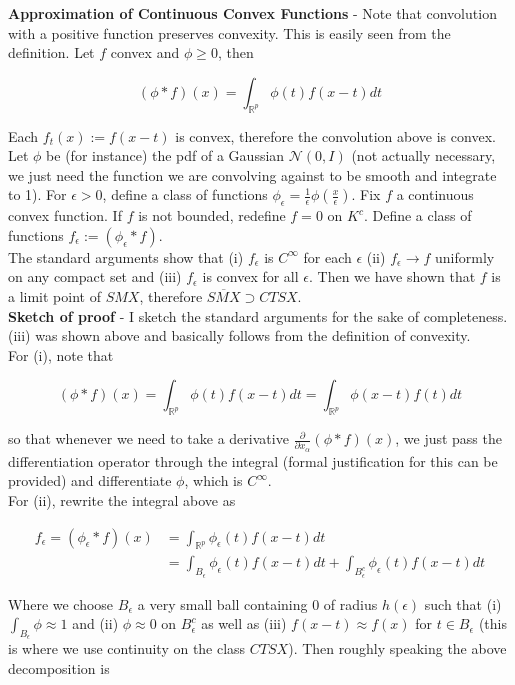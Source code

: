 \documentclass[11pt,reqno]{amsart}
\theoremstyle{definition}
\numberwithin{equation}{section}
\newcommand{\eps}{\epsilon}
\newcommand{\mc}{\mathcal}
\newcommand{\mr}{\mathbb{R}}
\newcommand{\tb}{\textbf}
\newcommand{\pa}{\partial}
\begin{document}
\tb{Approximation of Continuous Convex Functions} - Note that convolution with a positive function preserves convexity. This is easily seen from the definition. Let $f$ convex and $\phi \geq 0$, then 

\[
(\phi \ast f)(x) = \int_{\mr^p} \phi(t) f(x - t) dt 
\]

Each $f_t(x) := f(x -t)$ is convex, therefore the convolution above is convex. \\

Let $\phi$ be (for instance) the pdf of a Gaussian $\mc{N}(0,I)$ (not actually necessary, we just need the function we are convolving against to be smooth and integrate to 1). For $\eps > 0$, define a class of functions $\phi_{\eps} = \frac{1}{\eps} \phi(\frac{x}{\eps})$. Fix $f$ a continuous convex function. If $f$ is not bounded, redefine $f = 0$ on $K^c$.  Define a class of functions $f_{\eps} := (\phi_{\eps} \ast f)$.\\

The standard arguments show that (i) $f_{\eps}$ is $C^{\infty}$ for each $\eps$ (ii) $f_{\eps} \to f$ uniformly on any compact set and (iii) $f_{\eps}$ is convex for all $\eps$. Then we have shown that $f$ is a limit point of $SMX$, therefore $\overline{SMX} \supset CTSX$. \\

\tb{Sketch of proof} - I sketch the standard arguments for the sake of completeness. (iii) was shown above and basically follows from the definition of convexity. \\

For (i), note that 

\[
(\phi \ast f)(x) = \int_{\mr^p} \phi(t) f(x - t) dt = \int_{\mr^p} \phi(x - t) f(t) dt 
\]

so that whenever we need to take a derivative $\frac{\pa}{\pa x_{\alpha}} (\phi \ast f)(x)$, we just pass the differentiation operator through the integral (formal justification for this can be provided) and differentiate $\phi$, which is $C^{\infty}$. \\

For (ii), rewrite the integral above as 

\begin{align*}
f_{\eps} = (\phi_{\eps} \ast f)(x) &= \int_{\mr^p} \phi_{\eps}(t) f(x - t) dt\\
&=\int_{B_{\eps}} \phi_{\eps}(t) f(x - t) dt + \int_{B_{\eps}^c} \phi_{\eps}(t) f(x - t) dt
\end{align*}

Where we choose $B_{\eps}$ a very small ball containing $0$ of radius $h(\eps)$ such that (i) $\int_{B_{\eps}} \phi \approx 1$ and (ii) $\phi \approx 0 $ on $B_{\eps}^c$ as well as (iii) $f(x-t) \approx f(x)$ for $t \in B_{\eps}$ (this is where we use continuity on the class $CTSX$). Then roughly speaking the above decomposition is 
\end{document}
